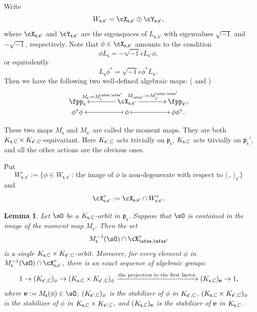 \documentclass[11pt,a4paper]{amsart}
\newcommand{\p}{\mathfrak p}
\newcommand{\la}{\langle}
\newcommand{\ra}{\rangle}
\newcommand{\be}{\begin {equation}}
\newcommand{\ee}{\end {equation}}
\numberwithin{equation}{section}
\newtheorem{lem}[thm]{Lemma}
\theoremstyle{remark}
\def\Vsp{V_{\sfss'}}
\def\Ls{L_\sfss}
\begin{document}
Write
\begin{equation}\label{def:Xss'}
   W_{\mathsf s, \mathsf s'}=\cX_{\mathsf s, \mathsf s'}\oplus  \cY_{\mathsf s, \mathsf s'},
\end{equation}
where $\cX_{\mathsf s, \mathsf s'}$ and $ \cY_{\mathsf s, \mathsf s'}$ are  the eigenspaces of $L_{\mathsf s, \mathsf s'}$ with eigenvalues $\sqrt{-1}$ and $-\sqrt{-1}$, respectively. Note that $\phi \in \cX_{\mathsf s, \mathsf s'}$ amounts to the condition 
  \[
 \phi L_{\mathsf s}=-\sqrt{-1}\dot \epsilon L_{\mathsf s'}
\phi,\]
or equivalently 
\begin{equation}\label{eq:eigen}
 L_{\mathsf s}\phi ^{*}=\sqrt{-1}\dot \epsilon \phi ^* L_{\mathsf s'}. 
 \end{equation}
Then we have the following two well-defined algebraic maps: (\cite[Section 1]{KP} and \cite[Section 2]{NOZ})
  \be\label{momentmap}
    \xymatrix@R=0em@C=4em{
      \fpp_\mathsf s &\ar[l]_{M_\mathsf s:=M_\mathsf s^{\sfss, \sfss'}} \cX_{\mathsf s, \mathsf s'}\ar[r]^{M_{\sfss'}:=M_{\mathsf s'}^{\sfss, \sfss'}}& \fpp_{\mathsf s'},\\
     \phi^* \phi & \ar@{|->}[l] \phi \ar@{|->}[r] & \phi \phi^*.
    }
  \ee

These two maps $M_\mathsf s$ and $M_{\mathsf s'}$ are called the moment maps. They are both $K_{\mathsf s,\mathbb{C}}\times K_{\mathsf s', \mathbb{C}}$-equivariant. Here  $K_{\mathsf s', \mathbb{C}}$ acts trivially on $\p_\mathsf s$,
 $K_{\mathsf s, \mathbb{C}}$ acts trivially on $\p_\mathsf s'$, and all the other actions are the obvious ones. 

Put
\[
  W_{\mathsf s, \mathsf s'}^\circ:=\{\phi\in W_{\mathsf s, \mathsf s'}\,:\, \textrm{the image of $\phi$ is non-degenerate with respect to $\la\,,\,\ra_{\mathsf s'}$}\}
\]
and
\[
  \cX_{\mathsf s, \mathsf s'}^\circ:=\cX_{\mathsf s, \mathsf s'}\cap W_{\mathsf s, \mathsf s'}^\circ.
\]


\def\Ms{M_{\sfss}}
\def\cXsso{\cX_{\sfss,\sfss'}^\circ}
\def\cXss{\cX_{\sfss,\sfss'}}
\def\Ksp{K_{\sfss',\bC}}
\def\Lsp{L_{\sfss'}}
\def\Ls{L_{\sfss}}
\def\Vsp{V_{\sfss'}}
\begin{lem}
  \label{descko}
Let $\sO$ be a $K_{\mathsf s, \mathbb{C}}$-orbit in $\p_{\mathsf s}$. Suppose that $\sO$ is contained in the image of the moment map $M_\mathsf s$. Then the set
\be\label{kkpo}
  M_{\mathsf s}^{-1}(\sO)\cap \cXsso
\ee
is a single $K_{\mathsf s,\mathbb{C}}\times K_{\mathsf s', \mathbb{C}}$-orbit. Moreover, for every element $\phi$ in $M_{\mathsf s}^{-1}(\sO)\cap \cX_{\mathsf s, \mathsf s'}^\circ$, there is an exact sequence of algebraic groups:
\[
  1\rightarrow (K_{\mathsf s',\mathbb{C}})_\phi \rightarrow (K_{\mathsf s,\mathbb{C}}\times K_{\mathsf s', \mathbb{C}})_\phi\xrightarrow{\textrm{the projection to the first factor}} (K_{\mathsf s,\mathbb{C}})_{\mathbf e}\rightarrow 1,
\]
where $\mathbf e:=M_\mathsf s(\phi)\in \sO$,  $(K_{\mathsf s',\mathbb{C}})_\phi$ is the stabilizer of $\phi$ in $K_{\mathsf s',\mathbb{C}}$, $(K_{\mathsf s,\mathbb{C}}\times K_{\mathsf s', \mathbb{C}})_\phi$ is the stabilizer of $\phi$ in $K_{\mathsf s,\mathbb{C}}\times K_{\mathsf s', \mathbb{C}}$, and $(K_{\mathsf s,\mathbb{C}})_{\mathbf e}$ is the stabilizer of $\mathbf e$ in $K_{\mathsf s,\mathbb{C}}$.
\end{lem}
\end{document}
